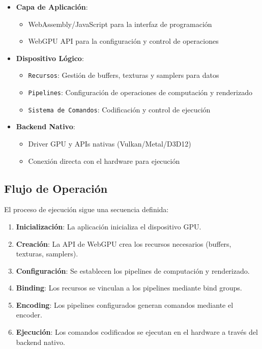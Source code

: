 \begin{itemize}
    \item \textbf{Capa de Aplicación}:
    \begin{itemize}
        \item WebAssembly/JavaScript para la interfaz de programación
        \item WebGPU API para la configuración y control de operaciones
    \end{itemize}

    \item \textbf{Dispositivo Lógico}:
    \begin{itemize}
        \item \texttt{Recursos}: Gestión de buffers, texturas y samplers para datos
        \item \texttt{Pipelines}: Configuración de operaciones de computación y renderizado
        \item \texttt{Sistema de Comandos}: Codificación y control de ejecución
    \end{itemize}

    \item \textbf{Backend Nativo}:
    \begin{itemize}
        \item Driver GPU y APIs nativas (Vulkan/Metal/D3D12)
        \item Conexión directa con el hardware para ejecución
    \end{itemize}
\end{itemize}

\subsection{Flujo de Operación}
\label{subsec:operation-flow}

El proceso de ejecución sigue una secuencia definida:

\begin{enumerate}
    \item \textbf{Inicialización}: La aplicación inicializa el dispositivo GPU.
    \item \textbf{Creación}: La API de WebGPU crea los recursos necesarios (buffers, texturas, samplers).
    \item \textbf{Configuración}: Se establecen los pipelines de computación y renderizado.
    \item \textbf{Binding}: Los recursos se vinculan a los pipelines mediante bind groups.
    \item \textbf{Encoding}: Los pipelines configurados generan comandos mediante el encoder.
    \item \textbf{Ejecución}: Los comandos codificados se ejecutan en el hardware a través del backend nativo.
\end{enumerate}

